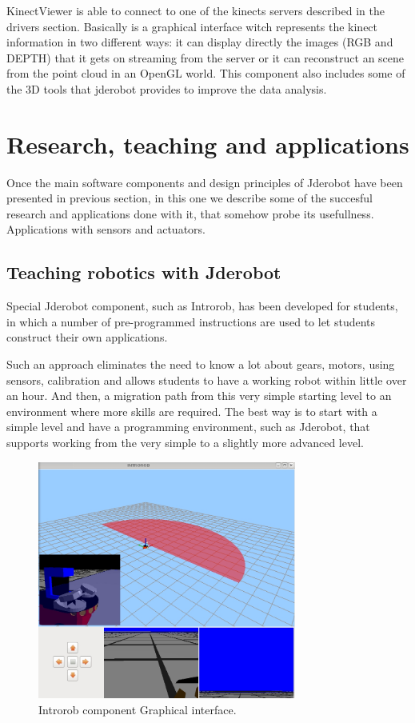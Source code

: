 \documentclass[twocolumn]{svjour3}          %
\begin{document}
KinectViewer is able to connect to one of the kinects servers described  in the drivers section. Basically is a graphical interface witch represents the kinect information in two different ways: it can display directly the images (RGB and DEPTH) that it gets on streaming from the server or it can reconstruct an scene from the point cloud in an OpenGL world. This component also includes some of the 3D tools that jderobot provides to improve the data analysis. 


\section{Research, teaching and applications}
\label{sec:applications}

Once the main software components and design principles of Jderobot have been presented in previous section, in this one we describe some of the succesful research and applications done with it, that somehow probe its usefullness. Applications with sensors and actuators.

\subsection{Teaching robotics with Jderobot}

Special Jderobot component, such as Introrob, has been developed for students, in which a number of pre-programmed instructions are used to let students construct their own applications.

Such an approach eliminates the need to know a lot about gears, motors, using sensors, calibration and allows students to have a working robot within little over an hour. And then, a migration path from this very simple starting level to an environment where more skills are required. The best way is to start with a simple level and have a programming environment, such as Jderobot, that supports working from the very simple to a slightly more advanced level.

\begin{figure}[h!]
  \includegraphics[width=8.5cm]{figs/introrob.jpg}
\caption{Introrob component Graphical interface.}
\label{fig:introrob}
\end{figure}
\end{document}
